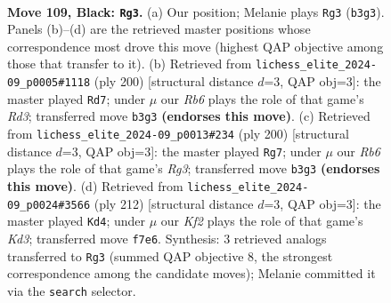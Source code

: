 \documentclass[11pt]{article}
\begin{document}
\clearpage

\begin{figure}[p]\centering
\begin{subfigure}{0.46\textwidth}\centering
\resizebox{\linewidth}{!}{%
\newchessgame
\chessboard[
  setfen={8/5k2/8/8/8/1r6/3RK3/7r b - - 29 109},
  showmover=false,
  pgfstyle=straightmove, color=movearrow, markmove={b3-g3}
]}
\caption{}
\end{subfigure}\hfill
\begin{subfigure}{0.46\textwidth}\centering
\resizebox{\linewidth}{!}{%
\newchessgame
\chessboard[
  setfen={8/8/8/6K1/8/3R4/8/1rk5 w - - 65 101},
  showmover=false,
  pgfstyle=straightmove, color=movearrow, markmove={d3-d7}
]}
\caption{}
\end{subfigure}
\\[4pt]
\begin{subfigure}{0.46\textwidth}\centering
\resizebox{\linewidth}{!}{%
\newchessgame
\chessboard[
  setfen={2K5/8/8/8/8/6R1/k7/r7 w - - 72 101},
  showmover=false,
  pgfstyle=straightmove, color=movearrow, markmove={g3-g7}
]}
\caption{}
\end{subfigure}\hfill
\begin{subfigure}{0.46\textwidth}\centering
\resizebox{\linewidth}{!}{%
\newchessgame
\chessboard[
  setfen={R7/8/8/1r6/1k6/3K4/8/8 w - - 50 107},
  showmover=false,
  pgfstyle=straightmove, color=movearrow, markmove={d3-d4}
]}
\caption{}
\end{subfigure}
\caption{\textbf{Move 109, Black: \texttt{Rg3}.} (a) Our position; Melanie plays \texttt{Rg3} (\texttt{b3g3}). Panels (b)--(d) are the retrieved master positions whose correspondence most drove this move (highest QAP objective among those that transfer to it). (b) Retrieved from \texttt{lichess\_elite\_2024-09\_p0005\#1118} (ply 200) [structural distance $d$=3, QAP obj=3]: the master played \texttt{Rd7}; under $\mu$ our \emph{Rb6} plays the role of that game's \emph{Rd3}; transferred move \texttt{b3g3} \textbf{(endorses this move)}. (c) Retrieved from \texttt{lichess\_elite\_2024-09\_p0013\#234} (ply 200) [structural distance $d$=3, QAP obj=3]: the master played \texttt{Rg7}; under $\mu$ our \emph{Rb6} plays the role of that game's \emph{Rg3}; transferred move \texttt{b3g3} \textbf{(endorses this move)}. (d) Retrieved from \texttt{lichess\_elite\_2024-09\_p0024\#3566} (ply 212) [structural distance $d$=3, QAP obj=3]: the master played \texttt{Kd4}; under $\mu$ our \emph{Kf2} plays the role of that game's \emph{Kd3}; transferred move \texttt{f7e6}. Synthesis: 3 retrieved analogs transferred to \texttt{Rg3} (summed QAP objective 8, the strongest correspondence among the candidate moves); Melanie committed it via the \texttt{search} selector.}
\label{fig:thought-m217}
\end{figure}
\end{document}
